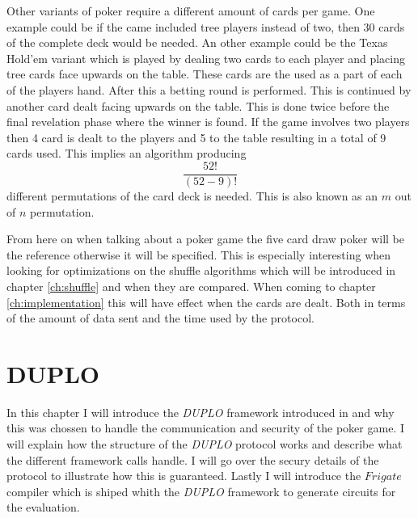 \documentclass[twoside,11pt,openright]{report}
\newcommand{\DUPLO}{\textit{DUPLO} }
\begin{document}
Other variants of poker require a different amount of cards per game. One example could be if the came included tree players instead of two, then 30 cards of the complete deck would be needed. An other example could be the Texas Hold'em variant which is played by dealing two cards to each player and placing tree cards face upwards on the table. These cards are the used as a part of each of the players hand. After this a betting round is performed. This is continued by another card dealt facing upwards on the table. This is done twice before the final revelation phase where the winner is found. If the game involves two players then 4 card is dealt to the players and 5 to the table resulting in a total of 9 cards used. This implies an algorithm producing $$\frac{52!}{(52-9)!}$$ different permutations of the card deck is needed. This is also known as an $m$ out of $n$ permutation.

From here on when talking about a poker game the five card draw poker will be the reference otherwise it will be specified. This is especially interesting when looking for optimizations on the shuffle algorithms which will be introduced in chapter \ref{ch:shuffle} and when they are compared. When coming to chapter \ref{ch:implementation} this will have effect when the cards are dealt. Both in terms of the amount of data sent and the time used by the protocol.


\chapter{DUPLO}
\label{ch:duplo}

In this chapter I will introduce the \DUPLO framework introduced in  and why this was chossen to handle the communication and security of the poker game. I will explain how the structure of the \DUPLO protocol works and describe what the different framework calls handle. I will go over the secury details of the protocol to illustrate how this is guaranteed. Lastly I will introduce the $Frigate$ compiler which is shiped whith the \DUPLO framework to generate circuits for the evaluation.

\bigskip
\end{document}
